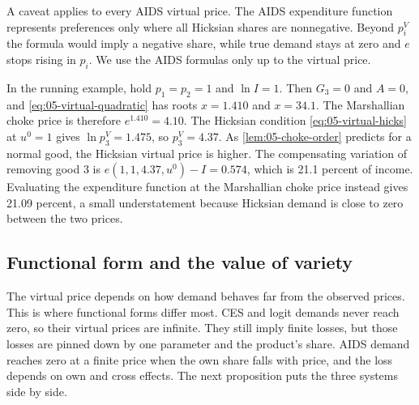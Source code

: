 A caveat applies to every AIDS virtual price. The AIDS expenditure function represents preferences only where
all Hicksian shares are nonnegative. Beyond $p_i^V$ the formula would imply a negative share, while true
demand stays at zero and $e$ stops rising in $p_i$. We use the AIDS formulas only up to the virtual price.

\begin{example}\label{ex:05-virtual-running}
In the running example, hold $p_1 = p_2 = 1$ and $\ln I = 1$. Then $G_3 = 0$ and $A = 0$, and
\eqref{eq:05-virtual-quadratic} has roots $x = 1.410$ and $x = 34.1$. The Marshallian choke price is therefore
$e^{1.410} = 4.10$. The Hicksian condition \eqref{eq:05-virtual-hicks} at $u^0 = 1$ gives $\ln p_3^V = 1.475$,
so $p_3^V = 4.37$. As \cref{lem:05-choke-order} predicts for a normal good, the Hicksian virtual price is higher.
The compensating variation of removing good 3 is $e(1,1,4.37,u^0) - I = 0.574$, which is 21.1 percent of
income. Evaluating the expenditure function at the Marshallian choke price instead gives 21.09 percent, a small
understatement because Hicksian demand is close to zero between the two prices.
\end{example}

\subsection{Functional form and the value of variety}\label{sec:05-welfare-variety}

The virtual price depends on how demand behaves far from the observed prices. This is where functional forms
differ most. CES and logit demands never reach zero, so their virtual prices are infinite. They still imply
finite losses, but those losses are pinned down by one parameter and the product's share. AIDS demand reaches
zero at a finite price when the own share falls with price, and the loss depends on own and cross effects. The next proposition puts the three
systems side by side.

